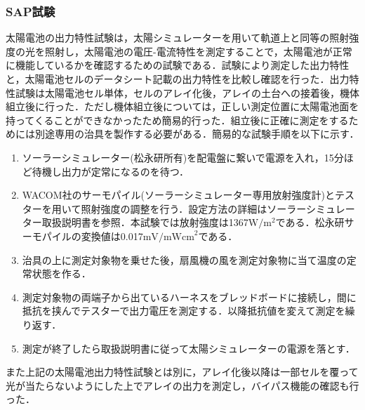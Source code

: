 \subsubsection{SAP試験}
太陽電池の出力特性試験は，太陽シミュレーターを用いて軌道上と同等の照射強度の光を照射し，太陽電池の電圧-電流特性を測定することで，太陽電池が正常に機能しているかを確認するための試験である．試験により測定した出力特性と，太陽電池セルのデータシート記載の出力特性を比較し確認を行った．出力特性試験は太陽電池セル単体，セルのアレイ化後，アレイの土台への接着後，機体組立後に行った．ただし機体組立後については，正しい測定位置に太陽電池面を持ってくることができなかったため簡易的行った．組立後に正確に測定をするためには別途専用の治具を製作する必要がある．簡易的な試験手順を以下に示す．
\begin{enumerate}
	\item ソーラーシミュレーター(松永研所有)を配電盤に繋いで電源を入れ，15分ほど待機し出力が定常になるのを待つ．
	\item WACOM社のサーモパイル(ソーラーシミュレーター専用放射強度計)とテスターを用いて照射強度の調整を行う．設定方法の詳細はソーラーシミュレーター取扱説明書を参照．本試験では放射強度は1367$\textrm{W}/\textrm{m}^2$である．松永研サーモパイルの変換値は0.017$\textrm{mV}/\textrm{mWcm}^2$である．
	\item 治具の上に測定対象物を乗せた後，扇風機の風を測定対象物に当て温度の定常状態を作る．
	\item 測定対象物の両端子から出ているハーネスをブレッドボードに接続し，間に抵抗を挟んでテスターで出力電圧を測定する．以降抵抗値を変えて測定を繰り返す．
	\item 測定が終了したら取扱説明書に従って太陽シミュレーターの電源を落とす．
\end{enumerate}
また上記の太陽電池出力特性試験とは別に，アレイ化後以降は一部セルを覆って光が当たらないようにした上でアレイの出力を測定し，バイパス機能の確認も行った．

